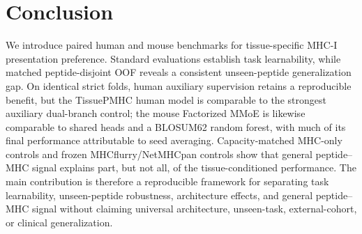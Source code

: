 \section{Conclusion}

We introduce paired human and mouse benchmarks for tissue-specific MHC-I presentation preference. Standard evaluations establish task learnability, while matched peptide-disjoint OOF reveals a consistent unseen-peptide generalization gap. On identical strict folds, human auxiliary supervision retains a reproducible benefit, but the TissuePMHC human model is comparable to the strongest auxiliary dual-branch control; the mouse Factorized MMoE is likewise comparable to shared heads and a BLOSUM62 random forest, with much of its final performance attributable to seed averaging. Capacity-matched MHC-only controls and frozen MHCflurry/NetMHCpan controls show that general peptide--MHC signal explains part, but not all, of the tissue-conditioned performance. The main contribution is therefore a reproducible framework for separating task learnability, unseen-peptide robustness, architecture effects, and general peptide--MHC signal without claiming universal architecture, unseen-task, external-cohort, or clinical generalization.
